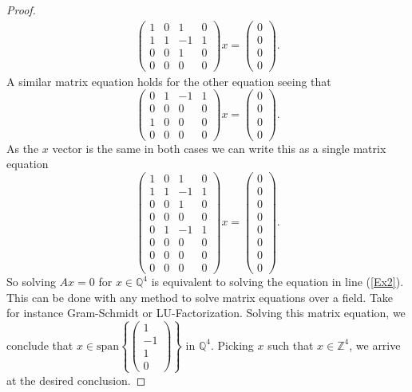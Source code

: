 \documentclass{article}
\newcommand{\Z}[0]{\mathbb{Z}}		%
\newcommand{\Q}[0]{\mathbb{Q}}		%
\theoremstyle{definition}
\theoremstyle{remark}
\begin{document}
\begin{proof}
\begin{align}
    \begin{pmatrix}1&0&1&0\\1&1&-1&1\\0&0&1&0\\0&0&0&0\end{pmatrix} x =\begin{pmatrix}0\\0\\0\\0\end{pmatrix} . 
\end{align} A similar matrix equation holds for the other equation seeing that \begin{equation}\begin{pmatrix}0&1&-1&1\\0&0&0&0\\1&0&0&0\\0&0&0&0\end{pmatrix} x =\begin{pmatrix}0\\0\\0\\0\end{pmatrix}. \end{equation} As the $x$ vector is the same in both cases we can write this as a single matrix equation \begin{equation}\label{Ex2}
    \begin{pmatrix}1&0&1&0\\1&1&-1&1\\0&0&1&0\\0&0&0&0\\0&1&-1&1\\0&0&0&0\\0&0&0&0\\0&0&0&0\end{pmatrix} x=\begin{pmatrix}0\\0\\0\\0\\0\\0\\0\\0\end{pmatrix}. 
\end{equation} 
So solving $Ax=0$ for $x\in \Q^4$ is equivalent to solving the equation in line (\ref{Ex2}). This can be done with any method to solve matrix equations over a field. Take for instance Gram-Schmidt or LU-Factorization. Solving this matrix equation, we conclude that $x\in \text{span}\left\{\begin{pmatrix} 1\\ -1\\ 1\\ 0\end{pmatrix}\right\} $ in $\Q^4$. Picking $x$ such that $x\in \Z^4$, we arrive at the desired conclusion. 
\end{proof}
\end{document}
